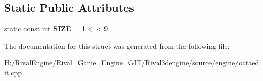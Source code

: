\subsection*{Static Public Attributes}
\begin{DoxyCompactItemize}
\item 
\mbox{\label{structprefabmesh_a9c0839751d085b94a5368ccb5f859d1a}} 
static const int {\bfseries S\+I\+ZE} = 1$<$$<$9
\end{DoxyCompactItemize}


The documentation for this struct was generated from the following file\+:\begin{DoxyCompactItemize}
\item 
H\+:/\+Rival\+Engine/\+Rival\+\_\+\+Game\+\_\+\+Engine\+\_\+\+G\+I\+T/\+Rival3dengine/source/engine/octaedit.\+cpp\end{DoxyCompactItemize}
